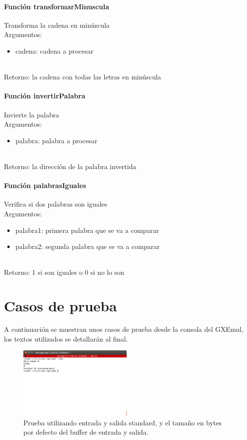 \documentclass[a4paper]{article}
\begin{document}
\paragraph{Función transformarMinuscula}
Transforma la cadena en minúscula \\
Argumentos:
	\begin{itemize}
	\item cadena: cadena a procesar
\end{itemize} \\
Retorno: la cadena con todas las letras en minúscula


\paragraph{Función invertirPalabra}
Invierte la palabra \\
Argumentos: 
	\begin{itemize}
	\item palabra: palabra a procesar
	\end{itemize} \\
Retorno: la dirección de la palabra invertida


\paragraph{Función palabrasIguales}
Verifica si dos palabras son iguales \\
Argumentos:
\begin{itemize}
	\item palabra1: primera palabra que se va a comparar
	\item palabra2: segunda palabra que se va a comparar
\end{itemize} \\
Retorno: 1 si son iguales o 0 si no lo son


\pagebreak
\section{Casos de prueba}

A continuación se muestran unos casos de prueba desde la consola del GXEmul, los textos utilizados se detallarán al final.


\begin{figure}[!htp]
\begin{center}
\includegraphics[width=0.5\textwidth]{imagenes_casosDePrueba_tp1/prueba0.png}
\caption{Prueba utilizando entrada y salida standard, y el tamaño en bytes por defecto del buffer de entrada y salida.} \label{fig001}
\end{center}
\end{figure}
\end{document}
